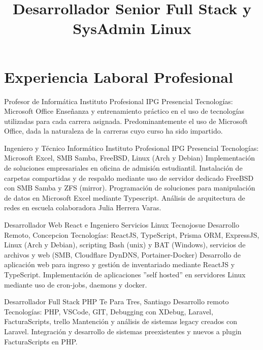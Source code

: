 \documentclass[draft,color,12pt,letterpaper,sans]{moderncv}
\title {Desarrollador Senior Full Stack y SysAdmin Linux}
\begin{document}
\makecvtitle %

\section{Experiencia Laboral Profesional}


{Profesor de Informática}
{Instituto Profesional IPG}
{\newline Presencial}
{\newline Tecnologías: Microsoft Office}
{Enseñanza y entrenamiento práctico en el uso de tecnologías utilizadas para cada carrera asignada. Predominantemente el uso de Microsoft Office, dada la naturaleza de la carreras cuyo curso ha sido impartido.\newline}

{Ingeniero y Técnico Informático}
{Instituto Profesional IPG}
{\newline Presencial}
{\newline Tecnologías: Microsoft Excel, SMB Samba, FreeBSD, Linux (Arch y Debian)}
{Implementación de soluciones empresariales en oficina de  admisión estudiantil. Instalación de carpetas compartidas y de respaldo mediante uso de servidor dedicado FreeBSD con SMB Samba y ZFS (mirror). Programación de soluciones para manipulación de datos en Microsoft Excel mediante Typescript. Análisis de arquitectura de redes en escuela colaboradora Julia Herrera Varas.\newline}


{Desarrollador Web React e Ingeniero Servicios Linux}
{Tecnojosue}
{\newline Desarrollo Remoto, Concepcion}
{\newline Tecnologías:  ReactJS, TypeScript, Prisma ORM, ExpressJS, Linux (Arch y Debian), scripting Bash (unix) y BAT (Windows), servicios de archivos y web (SMB, Cloudflare DynDNS, Portainer-Docker)}
{Desarrollo de aplicación web para ingreso y gestión de inventariado mediante ReactJS y TypeScript. Implementación de aplicaciones ”self hosted” en servidores Linux mediante uso de cron-jobs, daemons y docker.\newline}

{Desarrollador Full Stack PHP}
{Te Para Tres, Santiago}
{\newline Desarrollo remoto}
{\newline Tecnologías: PHP, VSCode, GIT, Debugging con XDebug, Laravel, FacturaScripts, trello}
{Mantención y análisis de sistemas legacy creados con Laravel. Integración y desarrollo de sistemas preexistentes y nuevos a plugin FacturaScripts en PHP.\newline}
\end{document}

